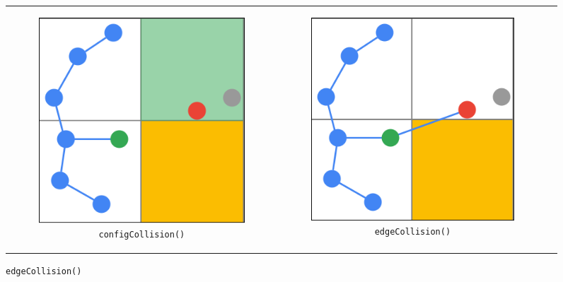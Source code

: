 \begin{figure}[t!]
\begin{centering}
\begin{tabular}{ccc}
    \begin{subfigure}{0.3\linewidth}
    \includegraphics[width=\linewidth]{chapters/chapter2/img/keyfunctions/functions4.png}
    \caption{\texttt{configCollision()}}
    \label{rrt_functions_d}
    \end{subfigure} &

    \begin{subfigure}{0.3\linewidth}
    \includegraphics[width=\linewidth]{chapters/chapter2/img/keyfunctions/functions5.png}
    \caption{\texttt{edgeCollision()}}
    \label{rrt_functions_e}
    \end{subfigure} & 


\end{tabular}
\end{centering}
\end{figure}
